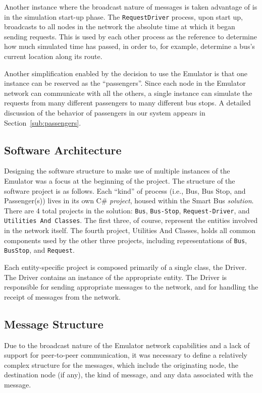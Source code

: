 \documentclass[runningheads]{llncs}
\begin{document}
Another instance where the broadcast nature of messages is taken advantage of is in the simulation start-up phase. The \lstinline{RequestDriver} process, upon start up, broadcasts to all nodes in the network the absolute time at which it began sending requests. This is used by each other process as the reference to determine how much simulated time has passed, in order to, for example, determine a bus's current location along its route.

Another simplification enabled by the decision to use the Emulator is that one instance can be reserved as the ``passengers''. Since each node in the Emulator network can communicate with all the others, a single instance can simulate the requests from many different passengers to many different bus stops. A detailed discussion of the behavior of passengers in our system appears in Section~\ref{sub:passengers}.

\subsection{Software Architecture}
Designing the software structure to make use of multiple instances of the Emulator was a focus at the beginning of the project. The structure of the software project is as follows. Each ``kind'' of process (i.e., Bus, Bus Stop, and Passenger(s)) lives in its own C\# \emph{project}, housed within the Smart Bus \emph{solution}. There are 4 total projects in the solution: \lstinline{Bus}, \lstinline{Bus-Stop}, \lstinline{Request-Driver}, and \lstinline{Utilities And Classes}. The first three, of course, represent the entities involved in the network itself. The fourth project, Utilities And Classes, holds all common components used by the other three projects, including representations of \lstinline{Bus}, \lstinline{BusStop}, and \lstinline{Request}.

Each entity-specific project is composed primarily of a single class, the Driver. The Driver contains an instance of the appropriate entity. The Driver is responsible for sending appropriate messages to the network, and for handling the receipt of messages from the network.

\subsection{Message Structure}
Due to the broadcast nature of the Emulator network capabilities and a lack of support for peer-to-peer communication, it was necessary to define a relatively complex structure for the messages, which include the originating node, the destination node (if any), the kind of message, and any data associated with the message.
\end{document}
